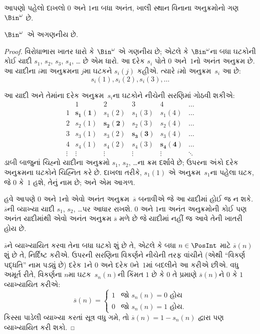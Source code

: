 આપણો પહેલો દાખલો $0$ અને $1$ના બધા અનંત, ખાલી સ્થાન વિનાના
અનુક્રમોનો ગણ~$\Bin^\omega$ છે.

\begin{thm}
$\Bin^\omega$~એ અગણનીય છે.
\end{thm}

\begin{proof}
વિરોધાભાસ ખાતર ધારો કે $\Bin^\omega$ એ ગણનીય છે;
એટલે કે $\Bin^\omega$ના બધા ઘટકોની કોઈ યાદી
$s_{1}$, $s_{2}$, $s_{3}$, $s_{4}$, \dots{} છે એમ ધારો.
આ દરેક $s_i$ પોતે $0$ અને~$1$નો અનંત અનુક્રમ છે.
આ યાદીના $i$મા અનુક્રમના $j$મા ઘટકને $s_i(j)$ કહીએ.
ત્યારે $i$મો અનુક્રમ~$s_i$ આ છે:
\[
s_i(1), s_i(2), s_i(3), \dots
\]

આ યાદી અને તેમાંના દરેક અનુક્રમ~$s_i$ના ઘટકોને નીચેની
સરણિમાં ગોઠવી શકીએ:
\[
\begin{array}{c|c|c|c|c|c}
& 1 & 2 & 3 & 4 & \dots \\\hline
1 & \mathbf{s_{1}(1)} & s_{1}(2) & s_{1}(3) & s_1(4) & \dots \\\hline
2 & s_{2}(1)& \mathbf{s_{2}(2)} & s_2(3) & s_2(4) & \dots \\\hline
3 & s_{3}(1)& s_{3}(2) & \mathbf{s_3(3)} & s_3(4) & \dots \\\hline
4 & s_{4}(1)& s_{4}(2) & s_4(3) & \mathbf{s_4(4)} & \dots \\\hline
\vdots & \vdots & \vdots & \vdots & \vdots & \mathbf{\ddots}
\end{array}
\]
ડાબી બાજુનાં ચિહ્નો યાદીના અનુક્રમો $s_1$, $s_2$, \dots{}ના
ક્રમ દર્શાવે છે; ઉપરના અંકો દરેક અનુક્રમના ઘટકોને
ચિહ્નિત કરે છે. દાખલા તરીકે, $s_{1}(1)$ એ અનુક્રમ~$s_{1}$ના
પહેલા ઘટક, જે $0$ કે~$1$ હશે, તેનું નામ છે; અને એમ આગળ.

હવે આપણે $0$ અને $1$નો એવો અનંત અનુક્રમ~$\overline{s}$ બનાવીએ
જે આ યાદીમાં હોઈ જ ન શકે. $\overline{s}$ની વ્યાખ્યા યાદી
$s_1$, $s_2$, \dots પર આધાર રાખશે. $0$ અને $1$ના અનંત
અનુક્રમોની કોઈ પણ અનંત યાદીમાંથી એવો અનંત અનુક્રમ
$\overline{s}$ મળે છે જે યાદીમાં નહીં જ આવે તેની ખાતરી હોય છે.

$\overline{s}$ને વ્યાખ્યાયિત કરવા તેના બધા ઘટકો શું છે તે,
એટલે કે બધા $n \in \PosInt$ માટે $\overline{s}(n)$ શું છે તે,
નિર્દિષ્ટ કરીએ. ઉપરની સરણિના વિકર્ણને નીચેની તરફ વાંચીને
(એથી ``વિકર્ણ પદ્ધતિ'' નામ પડ્યું છે) દરેક $1$ને $0$ અને દરેક
$0$ને~$1$માં બદલીને આ કરીએ છીએ. વધુ અમૂર્ત રીતે,
વિકર્ણના $n$મા ઘટક~$s_n(n)$ની કિંમત $1$ છે કે $0$
તે પ્રમાણે $\overline{s}(n)$ને $0$ કે $1$ વ્યાખ્યાયિત કરીએ:
\[
\overline{s}(n) =
\begin{cases}
1 & \text{જો $s_{n}(n) = 0$ હોય}\\
0 & \text{જો $s_{n}(n) = 1$ હોય}.
\end{cases}
\]
કિસ્સા પાડેલી વ્યાખ્યા કરતાં સૂત્ર વધુ ગમે, તો
$\overline{s}(n) = 1 - s_n(n)$ દ્વારા પણ વ્યાખ્યાયિત કરી શકો.


\end{proof}
